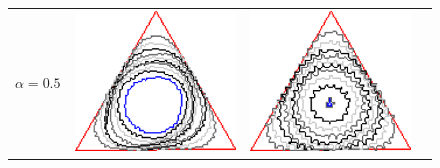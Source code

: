 \begin{figure}
\begin{tabular}{p{2.5em}ccc}
\multirow{2}{*}{$\alpha=0.5$}& \includegraphics[scale=0.25]{figures/chapter6/radius-effect/triangle/improve/len_pen0.5/radius-3/summary.pdf} &
\includegraphics[scale=0.24]{figures/chapter6/radius-effect/triangle/improve/len_pen0.5/radius-5/summary.pdf} &

\end{tabular}
\end{figure}
